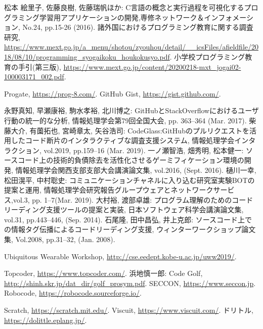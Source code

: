 \begin{thebibliography}{99}
	
	松本 絵里子, 佐藤良樹, 佐藤瑞帆ほか: C言語の概念と実行過程を可視化するプログラミング学習用アプリケーションの開発,専修ネットワーク＆インフォメーション, No.24, pp.15-26 (2016).
	諸外国におけるプログラミング教育に関する調査研究, \url{https://www.mext.go.jp/a_menu/shotou/zyouhou/detail/__icsFiles/afieldfile/2018/08/10/programming_syogaikoku_houkokusyo.pdf}.
	小学校プログラミング教育の手引(第三版), \url{https://www.mext.go.jp/content/20200218-mxt_jogai02-100003171_002.pdf}.
	
	Progate, \url{https://prog-8.com/}.
	GitHub Gist, \url{https://gist.github.com/}.

	永野真知, 早瀬康裕, 駒水孝裕, 北川博之: GitHubとStackOverflowにおけるユーザ行動の統一的な分析, 情報処理学会第79回全国大会, pp. 363–364 (Mar. 2017).
	柴藤大介, 有薗拓也, 宮崎章太, 矢谷浩司: CodeGlass:GitHubのプルリクエストを活用したコード断片のインタラクティブな調査支援システム, 情報処理学会インタラクション, vol.2019, pp.159–16 (Mar. 2019).
	一ノ瀬智浩, 畑秀明, 松本健一: ソースコード上の技術的負債除去を活性化させるゲーミフィケーション環境の開発, 情報処理学会関西支部支部大会講演論文集, vol.2016, (Sept. 2016).
	樋川一幸, 松田滉平, 中村聡史: コミュニケーションチャネルに入り込む研究室実験BOTの提案と運用, 情報処理学会研究報告グループウェアとネットワークサービス,vol.3, pp. 1–7(Mar. 2019).
	大村裕, 渡部卓雄: プログラム理解のためのコードリーディング支援ツールの提案と実装, 日本ソフトウェア科学会講演論文集, vol.31, pp.443–446, (Sep. 2014).
	石尾隆, 田中昌弘, 井上克郎: ソースコード上での情報タグ伝播によるコードリーディング支援, ウィンターワークショップ論文集, Vol.2008, pp.31–32, (Jan. 2008).

	Ubiquitous Wearable Workshop, \url{http://cse.eedept.kobe-u.ac.jp/uww2019/}.

	Topcoder, \url{https://www.topcoder.com/}.
	浜地慎一郎: Code Golf, \url{http://shinh.skr.jp/dat_dir/golf_prosym.pdf}.
	SECCON, \url{https://www.seccon.jp}.
	Robocode, \url{https://robocode.sourceforge.io/}.

	Scratch, \url{https://scratch.mit.edu/}.
	Viscuit, \url{https://www.viscuit.com/}.
	ドリトル, \url{https://dolittle.eplang.jp/}.


\end{thebibliography}
